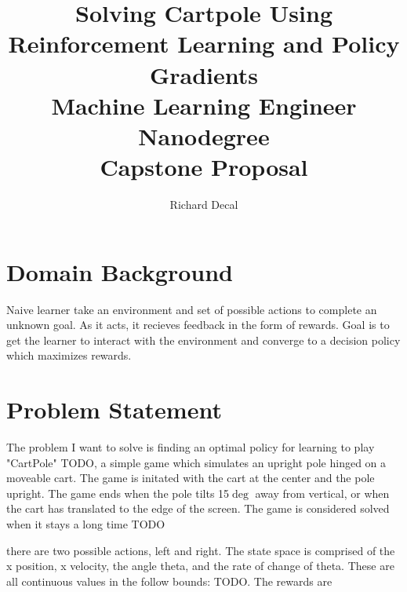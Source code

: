 \documentclass[12pt,a4paper]{article}
\author{Richard Decal}
\title{%
  Solving Cartpole Using Reinforcement Learning and Policy Gradients \\
  \large Machine Learning Engineer Nanodegree\\
  Capstone Proposal}
\begin{document}
\maketitle



\section*{Domain Background}
%
%
Naive learner take an environment and set of possible actions to complete an unknown goal. As it acts, it recieves feedback in the form of rewards. Goal is to get the learner to interact with the environment and converge to a decision policy which maximizes rewards.

%
%
%
\section*{Problem Statement}
%
%
The problem I want to solve is finding an optimal policy for learning to play "CartPole" TODO, a simple game which simulates an upright pole hinged on a moveable cart. The game is initated with the cart at the center and the pole upright. The game ends when the pole tilts 15$\deg$ away from vertical, or when the cart has translated to the edge of the screen. The game is considered solved when it stays a long time TODO 

there are two possible actions, left and right. The state space is comprised of the x position, x velocity, the angle theta, and the rate of change of theta. These are all continuous values in the follow bounds: TODO. The rewards are 
\end{document}
